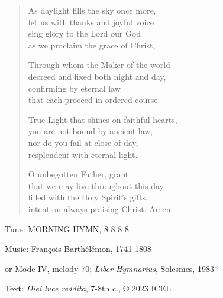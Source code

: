 \hymn

\begin{verse}
As daylight fills the sky once more,\\
let us with thanks and joyful voice\\
sing glory to the Lord our God\\
as we proclaim the grace of Christ,

Through whom the Maker of the world\\
decreed and fixed both night and day,\\
confirming by eternal law\\
that each proceed in ordered course.

True Light that shines on faithful hearts,\\
you are not bound by ancient law,\\
nor do you fail at close of day,\\
resplendent with eternal light.

O unbegotten Father, grant\\
that we may live throughout this day\\
filled with the Holy Spirit’s gifts,\\
intent on always praising Christ. Amen.
\end{verse}

\begin{hymnsource}
Tune: MORNING HYMN, 8 8 8 8

Music: François Barthélémon, 1741-1808

or Mode IV, melody 70; \emph{Liber Hymnarius}, Solesmes, 1983*

Text: \emph{Diei luce reddita}, 7-8th c., © 2023 ICEL
\end{hymnsource}